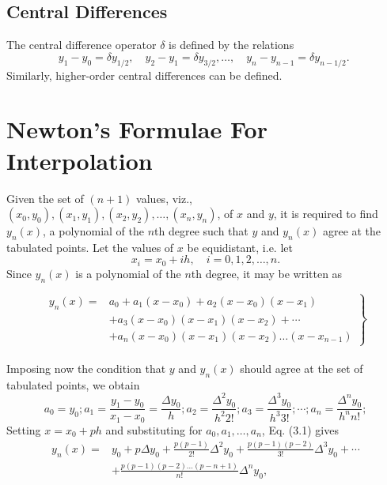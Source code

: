 \documentclass[12pt,a4paper,oneside]{book}
\begin{document}
\subsection{Central Differences}
The central difference operator $\delta$ is defined by the relations
$$
y_1-y_0=\delta y_{1 / 2}, \quad y_2-y_1=\delta y_{3 / 2}, \ldots, \quad y_n-y_{n-1}=\delta y_{n-1 / 2} \text {. }
$$
Similarly, higher-order central differences can be defined.
\section{Newton's Formulae For Interpolation }
Given the set of $(n+1)$ values, viz., $\left(x_0, y_0\right),\left(x_1, y_1\right),\left(x_2, y_2\right), \ldots,\left(x_n, y_n\right)$, of $x$ and $y$, it is required to find $y_n(x)$, a polynomial of the $n$th degree such that $y$ and $y_n(x)$ agree at the tabulated points. Let the values of $x$ be equidistant, i.e. let
$$
x_i=x_0+i h, \quad i=0,1,2, \ldots, n .
$$
Since $y_n(x)$ is a polynomial of the $n$th degree, it may be written as


\begin{equation}\label{3.1}
	\left.\begin{array}{rl}
		y_n(x)= & a_0+a_1\left(x-x_0\right)+a_2\left(x-x_0\right)\left(x-x_1\right) \\
		& +a_3\left(x-x_0\right)\left(x-x_1\right)\left(x-x_2\right)+\cdots \\
		& +a_n\left(x-x_0\right)\left(x-x_1\right)\left(x-x_2\right) \ldots\left(x-x_{n-1}\right)
	\end{array}\right\}
\end{equation}\\[0.5cm]


Imposing now the condition that $y$ and $y_n(x)$ should agree at the set of tabulated points, we obtain
$$
a_0=y_0 ; a_1=\frac{y_1-y_0}{x_1-x_0}=\frac{\Delta y_0}{h} ; a_2=\frac{\Delta^2 y_0}{h^2 2 !} ; a_3=\frac{\Delta^3 y_0}{h^3 3 !} ; \cdots ; a_n=\frac{\Delta^n y_0}{h^n n !} ;
$$
Setting $x=x_0+p h$ and substituting for $a_0, a_1, \ldots, a_n$, Eq. (3.1) gives
\begin{equation}\label{3.2}
	\begin{aligned}
		y_n(x)= & y_0+p \Delta y_0+\frac{p(p-1)}{2 !} \Delta^2 y_0+\frac{p(p-1)(p-2)}{3 !} \Delta^3 y_0+\cdots \\
		& +\frac{p(p-1)(p-2) \ldots(p-n+1)}{n !} \Delta^n y_0,
	\end{aligned}
\end{equation}
\end{document}
